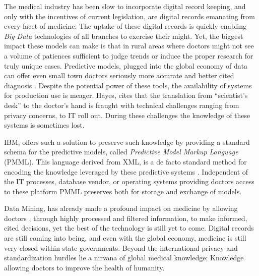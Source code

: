 \documentclass[12pt,letterpaper]{article}
\begin{document}
The
medical industry has been slow to incorporate digital record keeping, and only
with the incentives of current legislation, are digital records emanating from
every facet of medicine. The uptake of these digital records is quickly enabling
\emph{Big Data} technologies of all branches to exercise their might. Yet, the
biggest impact these models can make is that in rural areas where doctors might
not see a volume of patiences sufficient to judge trends or induce the proper
research for truly unique cases. Predictive models, plugged into the global
economy of data can offer even small town doctors seriously more accurate and
better cited diagnosis \autocite{Guazzelli2011}. Despite the potential power of
these tools, the availability of systems for production use is meager. Hayes,
cites that the translation from ``scientist's desk'' to the doctor's hand is
fraught with technical challenges ranging from privacy concerns, to IT roll out.
During these challenges the knowledge of these systems is sometimes lost. 

IBM, offers such a solution to preserve such knowledge by providing a standard
schema for the predictive models, called \emph{Predictive Model Markup Language}
(PMML). This language derived from XML, is a de facto standard method for
encoding the knowledge leveraged by these predictive systems
\autocite{WikiPredictiveLanguage}. Independent of
the IT processes, database vendor, or operating systems providing doctors access
to these platform PMML preserves both for storage and exchange of models. 

Data Mining, has already made a profound impact on medicine by allowing doctors
,  through highly processed and filtered information, to make informed, cited
decisions, yet the best of the technology is still yet to come. Digital records
are still coming into being, and even with the global economy, medicine is still
very closed within state governments. Beyond the international privacy and standardization
hurdles lie a nirvana of global medical knowledge; Knowledge allowing doctors to improve
the health of humanity. 



\printbibliography
\end{document}
